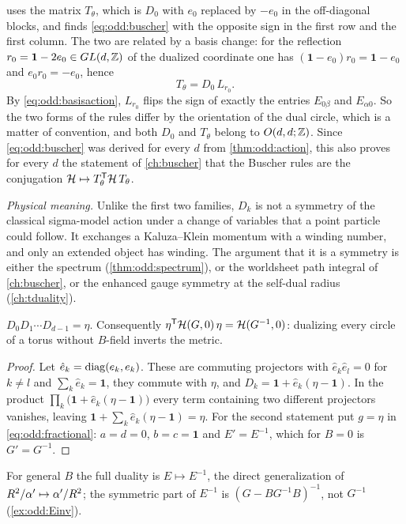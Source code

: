 \begin{remark}\label{rem:odd:sign}
 uses the matrix $T_\theta$, which is $D_0$ with $e_0$ replaced by $-e_0$
in the off-diagonal blocks, and finds \eqref{eq:odd:buscher} with the opposite sign in the
first row and the first column. The two are related by a basis change: for the reflection
$r_0=\mathbf 1-2e_0\in GL(d,\mathbb{Z})$ of the dualized coordinate one has
$(\mathbf 1-e_0)r_0=\mathbf 1-e_0$ and $e_0r_0=-e_0$, hence
\begin{equation}\label{eq:odd:Ttheta}
 T_\theta=D_0\,L_{r_0}.
\end{equation}
By \eqref{eq:odd:basisaction}, $L_{r_0}$ flips the sign of exactly the entries
$E_{0\beta}$ and $E_{\alpha0}$. So the two forms of the rules differ by the orientation of
the dual circle, which is a matter of convention, and both $D_0$ and $T_\theta$ belong to
$O(d,d;\mathbb{Z})$. Since \eqref{eq:odd:buscher} was derived for every $d$ from
\cref{thm:odd:action}, this also proves for every $d$ the statement of \cref{ch:buscher}
that the Buscher rules are the conjugation $\mathcal{H}\mapsto T_\theta^{\mathsf T}\mathcal{H}\,T_\theta$.
\end{remark}

\emph{Physical meaning.} Unlike the first two families, $D_k$ is not a symmetry of the
classical sigma-model action under a change of variables that a point particle could
follow. It exchanges a Kaluza--Klein momentum with a winding number, and only an extended
object has winding. The argument that it is a symmetry is either the spectrum
(\cref{thm:odd:spectrum}), or the worldsheet path integral of \cref{ch:buscher}, or the
enhanced gauge symmetry at the self-dual radius (\cref{ch:tduality}).

\begin{proposition}\label{prop:odd:product}
$D_0D_1\cdots D_{d-1}=\eta$. Consequently $\eta^{\mathsf T}\mathcal{H}(G,0)\,\eta=\mathcal{H}(G^{-1},0)$:
dualizing every circle of a torus without $B$-field inverts the metric.
\end{proposition}
\begin{proof}
Let $\hat e_k=\operatorname{diag}(e_k,e_k)$. These are commuting projectors with
$\hat e_k\hat e_l=0$ for $k\neq l$ and $\sum_k\hat e_k=\mathbf 1$, they commute with
$\eta$, and $D_k=\mathbf 1+\hat e_k(\eta-\mathbf 1)$. In the product
$\prod_k\big(\mathbf 1+\hat e_k(\eta-\mathbf 1)\big)$ every term containing two different
projectors vanishes, leaving $\mathbf 1+\sum_k\hat e_k(\eta-\mathbf 1)=\eta$. For the
second statement put $g=\eta$ in \eqref{eq:odd:fractional}: $a=d=0$, $b=c=\mathbf 1$ and
$E'=E^{-1}$, which for $B=0$ is $G'=G^{-1}$.
\end{proof}
For general $B$ the full duality is $E\mapsto E^{-1}$, the direct generalization of
$R^2/\alpha'\mapsto\alpha'/R^2$; the symmetric part of $E^{-1}$ is
$(G-BG^{-1}B)^{-1}$, not $G^{-1}$ (\cref{ex:odd:Einv}).

